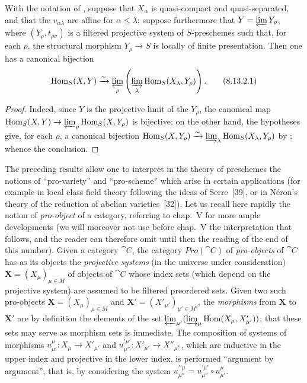 \begin{corollary}[8.13.2]
\label{IV.8.13.2}
With the notation of , suppose that $X_\alpha$ is quasi-compact and quasi-separated, and that the $v_{\alpha\lambda}$ are affine for $\alpha\leqslant\lambda$; suppose furthermore that $Y=\varprojlim Y_\rho$, where $(Y_\rho,t_{\rho\sigma})$ is a filtered projective system of $S$-preschemes such that, for each $\rho$, the structural morphism $Y_\rho\to S$ is locally of finite presentation.
Then one has a canonical bijection
\begin{equation}
\label{IV.8.13.2.1}
\operatorname{Hom}_S(X,Y)\xrightarrow{\sim}\varprojlim_\rho\left(\varinjlim_\lambda\operatorname{Hom}_S(X_\lambda,Y_\rho)\right). \tag{8.13.2.1}
\end{equation}
\end{corollary}

\begin{proof}
Indeed, since $Y$ is the projective limit of the $Y_\rho$, the canonical map $\operatorname{Hom}_S(X,Y)\to\varprojlim_\rho\operatorname{Hom}_S(X,Y_\rho)$ is bijective; on the other hand, the hypotheses give, for each $\rho$, a canonical bijection $\operatorname{Hom}_S(X,Y_\rho)\xrightarrow{\sim}\varinjlim_\lambda\operatorname{Hom}_S(X_\lambda,Y_\rho)$ by ; whence the conclusion.
\end{proof}

\begin{env}[8.13.3]
\label{IV.8.13.3}
The preceding results allow one to interpret in the theory of preschemes the notions of ``pro-variety'' and ``pro-scheme'' which arise in certain applications (for example in local class field theory following the ideas of Serre~[39], or in N\'eron's theory of the reduction of
abelian varieties~[32]).
Let us recall here rapidly the notion of \emph{pro-object} of a category, referring to chap.~V for more ample developments (we will moreover not use before chap.~V the interpretation that follows, and the reader can therefore omit until then the reading of the end of this number).
Given a category $\cat{C}$, the category $\boldsymbol{\mathit{Pro}}(\cat{C})$ of \emph{pro-objects} of $\cat{C}$ has as its objects the \emph{projective systems} (in the universe under consideration) $\mathbf{X}=(X_\mu)_{\mu\in M}$ of objects of $\cat{C}$ whose index sets (which depend on the projective system) are assumed to be filtered preordered sets.
Given two such pro-objects $\mathbf{X}=(X_\mu)_{\mu\in M}$ and $\mathbf{X}'=(X'_{\mu'})_{\mu'\in M'}$, the \emph{morphisms} from $\mathbf{X}$ to $\mathbf{X}'$ are by definition the elements of the set $\varprojlim_{\mu'}(\varinjlim_\mu\operatorname{Hom}(X_\mu,X'_{\mu'}))$; that these sets may serve as morphism sets is immediate. The composition of systems of morphisms $u_{\mu'}^\mu:X_\mu\to X'_{\mu'}$ and $u_{\mu''}^{\prime\mu'}:X'_{\mu'}\to X''_{\mu''}$, which are inductive in the upper index and projective in the lower index, is performed ``argument by argument'', that is, by considering the system $u_{\mu''}^{\prime\prime\mu}=u_{\mu''}^{\prime\mu'}\circ u_{\mu'}^\mu$.
\end{env}

